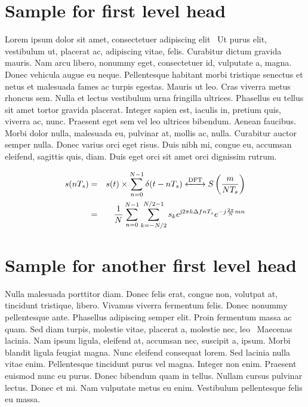 \documentclass[APA,LATO1COL]{WileyNJD-v2}
\begin{document}


\section{Sample for first level head}\label{sec1}

Lorem ipsum dolor sit amet, consectetuer adipiscing elit~\citet{Rothermel1997} Ut purus elit, vestibulum ut, placerat ac, adipiscing vitae,
felis. Curabitur dictum gravida mauris. Nam arcu libero, nonummy eget, consectetuer id, vulputate a, magna. Donec
vehicula augue eu neque. Pellentesque habitant morbi tristique senectus et netus et malesuada fames ac turpis egestas.
Mauris ut leo. Cras viverra metus rhoncus sem. Nulla et lectus vestibulum urna fringilla ultrices. Phasellus eu tellus
sit amet tortor gravida placerat. Integer sapien est, iaculis in, pretium quis, viverra ac, nunc. Praesent eget sem vel
leo ultrices bibendum. Aenean faucibus. Morbi dolor nulla, malesuada eu, pulvinar at, mollis ac, nulla. Curabitur
auctor semper nulla. Donec varius orci eget risus. Duis nibh mi, congue eu, accumsan eleifend, sagittis quis, diam.
Duis eget orci sit amet orci dignissim rutrum.

\begin{eqnarray}
s(nT_{s}) &= &s(t)\times \sum\limits_{n=0}^{N-1} \delta (t-nT_{s}) \xleftrightarrow{\mathrm{DFT}}  S \left(\frac{m}{NT_{s}}\right) \nonumber\\
&= &\frac{1}{N} \sum\limits_{n=0}^{N-1} \sum\limits_{k=-N/2}^{N/2-1} s_{k} e^{\mathrm{j}2\pi k\Delta fnT_{s}} e^{-j\frac{2\pi}{N}mn}
\end{eqnarray}

\section{Sample for another first level head}\label{sec2}

Nulla malesuada porttitor diam. Donec felis erat, congue non, volutpat at, tincidunt tristique, libero. Vivamus viverra
fermentum felis. Donec nonummy pellentesque ante. Phasellus adipiscing semper elit. Proin fermentum massa ac
quam. Sed diam turpis, molestie vitae, placerat a, molestie nec, leo~\cite{Rothermel1998} Maecenas lacinia. Nam ipsum ligula, eleifend
at, accumsan nec, suscipit a, ipsum. Morbi blandit ligula feugiat magna. Nunc eleifend consequat lorem. Sed lacinia
nulla vitae enim. Pellentesque tincidunt purus vel magna. Integer non enim. Praesent euismod nunc eu purus. Donec
bibendum quam in tellus. Nullam cursus pulvinar lectus. Donec et mi. Nam vulputate metus eu enim. Vestibulum
pellentesque felis eu massa.
\end{document}
